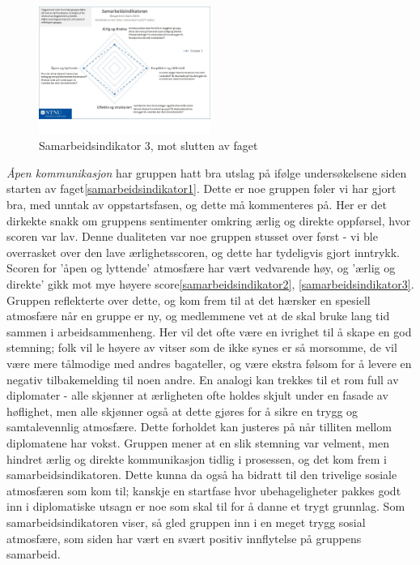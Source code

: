 \begin{figure}[h!]
  \caption{Samarbeidsindikator 3, mot slutten av faget}
  \centering
    \includegraphics[width=0.5\textwidth]{Bilder/samarbeidsindikator_3.jpg}
\end{figure}\label{samarbeidsindikator3}

\emph{Åpen kommunikasjon} har gruppen hatt bra utslag på ifølge undersøkelsene siden starten av faget\ref{samarbeidsindikator1}. Dette er noe gruppen føler vi har gjort bra, med unntak av oppstartsfasen, og dette må kommenteres på. Her er det dirkekte snakk om gruppens sentimenter omkring ærlig og direkte oppførsel, hvor scoren var lav. Denne dualiteten var noe gruppen stusset over først - vi ble overrasket over den lave ærlighetsscoren, og dette har tydeligvis gjort inntrykk. Scoren for 'åpen og lyttende' atmosfære har vært vedvarende høy, og 'ærlig og direkte' gikk mot mye høyere score\ref{samarbeidsindikator2}, \ref{samarbeidsindikator3}.
Gruppen reflekterte over dette, og kom frem til at det hærsker en spesiell atmosfære når en gruppe er ny, og medlemmene vet at de skal bruke lang tid sammen i arbeidsammenheng. Her vil det ofte være en ivrighet til å skape en god stemning; folk vil le høyere av vitser som de ikke synes er så morsomme, de vil være mere tålmodige med andres bagateller, og være ekstra følsom for å levere en negativ tilbakemelding til noen andre. En analogi kan trekkes til et rom full av diplomater - alle skjønner at ærligheten ofte holdes skjult under en fasade av høflighet, men alle skjønner også at dette gjøres for å sikre en trygg og samtalevennlig atmosfære. Dette forholdet kan justeres på når tilliten mellom diplomatene har vokst. Gruppen mener at en slik stemning var velment, men hindret ærlig og direkte kommunikasjon tidlig i prosessen, og det kom frem i samarbeidsindikatoren.
Dette kunna da også ha bidratt til den trivelige sosiale atmosfæren som kom til; kanskje en startfase hvor ubehageligheter pakkes godt inn i diplomatiske utsagn er noe som skal til for å danne et trygt grunnlag. Som samarbeidsindikatoren viser, så gled gruppen inn i en meget trygg sosial atmosfære, som siden har vært en svært positiv innflytelse på gruppens samarbeid.

